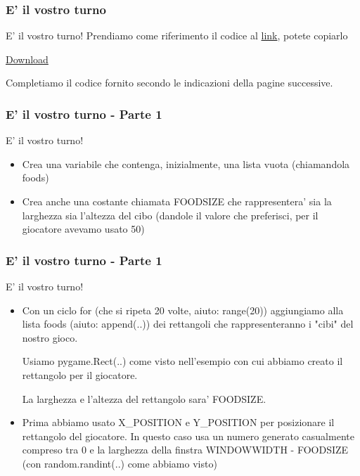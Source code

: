 \begin{frame}[fragile]
\frametitle{E' il vostro turno}

\begin{block}{E' il vostro turno!}
Prendiamo come riferimento il codice al \href{https://raw.githubusercontent.com/ragazzedigitalicesena/slide-2019/master/tex/chapter_19-20/collisionDetection.py}{link}, potete copiarlo

\href{https://raw.githubusercontent.com/ragazzedigitalicesena/slide-2019/master/tex/chapter_19-20/collisionDetection.py}{Download}

\vspace{5mm}
Completiamo il codice fornito secondo le indicazioni della pagine successive.
\end{block}

\end{frame}

\begin{frame}[fragile]
\frametitle{E' il vostro turno - Parte 1}
\begin{block}{E' il vostro turno!}
    \begin{itemize}
        \item Crea una variabile che contenga, inizialmente, una lista vuota (chiamandola foods)
        \item Crea anche una costante chiamata FOODSIZE che rappresentera' sia la larghezza sia l'altezza del cibo (dandole il valore che preferisci, per il giocatore avevamo usato 50)
    \end{itemize}{}
\end{block}
\end{frame}

\begin{frame}[fragile]
\frametitle{E' il vostro turno - Parte 1}
\begin{block}{E' il vostro turno!}
    \begin{itemize}
        \item Con un ciclo for (che si ripeta 20 volte, aiuto: range(20)) aggiungiamo alla lista foods  (aiuto: append(..)) dei rettangoli che rappresenteranno i "cibi" del nostro gioco.
        
        Usiamo pygame.Rect(..) come visto nell'esempio con cui abbiamo creato il rettangolo per il giocatore.
        
        La larghezza e l'altezza del rettangolo sara' FOODSIZE.
        \item Prima abbiamo usato X\_POSITION e Y\_POSITION per posizionare il rettangolo del giocatore. In questo caso usa un numero generato casualmente compreso tra 0 e la larghezza della finstra WINDOWWIDTH - FOODSIZE (con random.randint(..) come abbiamo visto)
    \end{itemize}{}
\end{block}
\end{frame}

